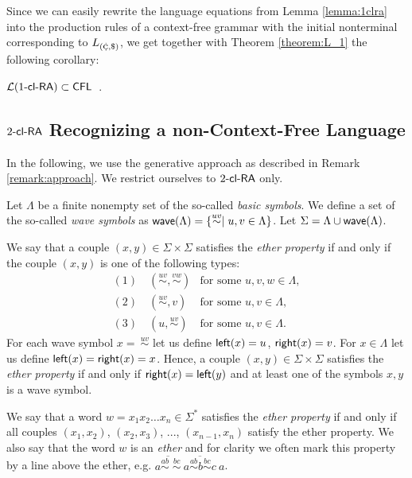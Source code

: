 Since we can easily rewrite the language equations from Lemma \ref{lemma:1clra}
into the production rules of a context-free grammar with the initial nonterminal corresponding to $L_{({\small \cent},\$)}$,
we get together with Theorem \ref{theorem:L_1} the following corollary:

\begin{corollary}
$\calL{\kclRA[1]} \subset \CFL$\ .
\end{corollary}

\subsection{$\kclRA[2]$ Recognizing a non-Context-Free Language}\label{2clRA-non-CFL}

In the following, we use the generative approach as described in Remark \ref{remark:approach}. We restrict ourselves to $\kclRA[2]$ only.

\begin{definition}\label{definition:ether}
Let $\Lambda$ be a finite nonempty set of the so-called \emph{basic symbols}. We define a set of the so-called \emph{wave symbols} as $\wave(\Lambda) = \{\stackrel{uv}{\sim} \mid u,v \in \Lambda\}$. Let $\Sigma = \Lambda \cup \wave(\Lambda)$.

We say that a couple $(x, y) \in \Sigma \times \Sigma$ satisfies the \emph{ether property} if and only if the couple $(x, y)$ is one of the following types:
$$
\begin{array}{ll}
(1) \quad (\stackrel{uv}{\sim}, \stackrel{vw}{\sim}) 	& \mbox{for some } u, v, w \in \Lambda,\\
(2) \quad (\stackrel{uv}{\sim}, v)					& \mbox{for some } u, v \in \Lambda,\\
(3) \quad (u, \stackrel{uv}{\sim})					& \mbox{for some } u, v \in \Lambda.
\end{array}
$$
For each wave symbol $x =\ \stackrel{uv}{\sim}$ let us define ${\sf left}(x) = u$, ${\sf right}(x) = v$. For $x \in \Lambda$ let us define ${\sf left}(x) = {\sf right}(x) = x$. Hence, a couple $(x, y) \in \Sigma \times \Sigma$ satisfies the \emph{ether property} if and only if ${\sf right}(x) = {\sf left}(y)$ and at least one of the symbols $x, y$ is a wave symbol.

We say that a word $w = x_1 x_2 \ldots x_n \in \Sigma^*$ satisfies the \emph{ether property} if and only if all couples $(x_1, x_2)$, $(x_2, x_3)$, ..., $(x_{n-1}, x_n)$ satisfy the ether property. We also say that the word $w$ is an \emph{ether} and for clarity we often mark this property by a line above the ether, e.g. $\overline{a \stackrel{ab}{\sim} \; \stackrel{bc}{\sim}}\ \overline{a \stackrel{ab}{\sim} b \stackrel{bc}{\sim} c}\ a$.
\end{definition}

